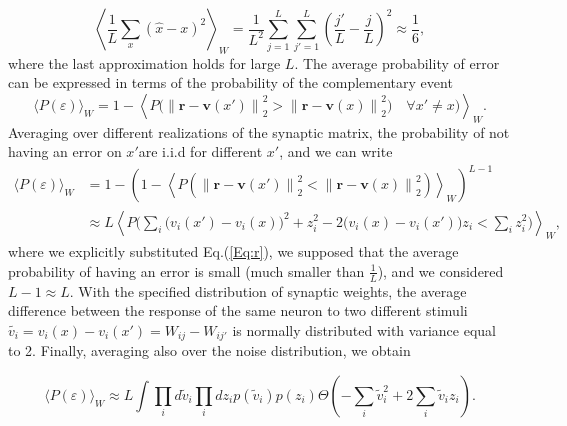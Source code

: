\documentclass[a4paper]{article}
\begin{document}
\begin{equation}
 \left\langle \frac{1}{L}\sum_x (\hat{x}-x)^2\right\rangle_W =\frac{1}{L^2}\sum_{j=1}^L \sum_{j'=1}^L \left(\frac{j'}{L}-\frac{j}{L}\right)^2 \approx \frac{1}{6},
\end{equation}
where the last approximation holds for large $L$.
The average probability of error  can be expressed in terms of the probability of the complementary event
\begin{equation}
\langle P(\varepsilon)\rangle_W  = 1 - \left\langle  P\Big(\left\lVert\mathbf{r}-\mathbf{v}(x')\right\rVert_2^2 >\left\lVert \mathbf{r}-\mathbf{v}(x)\right\rVert_2^2)   \quad \forall x' \neq x\Big) \right\rangle_W.
\end{equation}Averaging over different realizations of the synaptic matrix, the probability of not having an error on $x'$are i.i.d for different $x'$, and we can write
\begin{equation}
\begin{split}
\langle P(\varepsilon)\rangle_W &= 1 - \left(1 - \left\langle P\left(\left\lVert \mathbf{r}-\mathbf{v}(x')\right\rVert_2^2 <  \left\lVert\mathbf{r}-\mathbf{v}(x)\right\rVert_2^2 \right)\right\rangle_W\right)^{L-1} \\
& \approx L \left\langle  P\Big(\sum_i \big(v_i(x') -v_i(x)\big)^2 + z_i^2 - 2\big(v_i(x)-v_i(x')\big)z_i < \sum_i z_i^2 \Big) \right\rangle_W,
\end{split}
 \end{equation}where we explicitly substituted Eq.(\ref{Eq:r}), we supposed that the average probability of having an error is small (much smaller than $\frac{1}{L}$), and we considered $ L-1 \approx L$.  With the specified distribution of synaptic weights, the average difference between the response of the same neuron to two different stimuli  $\tilde{v_i} = v_i(x)-v_i(x') = W_{ij}-W_{ij'}$ is normally distributed with variance equal to 2. Finally, averaging also over the noise distribution, we obtain

\begin{equation}
 \langle P(\varepsilon)\rangle_W \approx L  \int \prod_i d \tilde{v}_i \prod_i dz_i p(\tilde{v}_i) p(z_i) \Theta \left(-\sum_i \tilde{v}^2_i +2\sum_i \tilde{v}_i z_i\right).
\end{equation}
\end{document}
